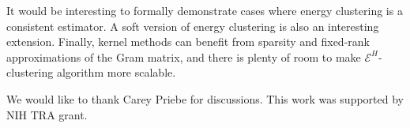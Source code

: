 \documentclass[aps,preprint,nofootinbib,floatfix]{revtex4-1}
\begin{document}
It would be interesting to formally 
demonstrate cases where energy clustering is a 
consistent estimator. A soft version of energy clustering is also an
interesting extension.
Finally, kernel methods can benefit from sparsity and
fixed-rank approximations of the Gram matrix, and there is plenty
of room to make $\mathcal{E}^H$-clustering algorithm more scalable.


\begin{acknowledgements}
\vspace{-1em}
We would like to thank Carey Priebe for discussions.
This work was supported by NIH TRA  grant.
\end{acknowledgements}



\end{document}
